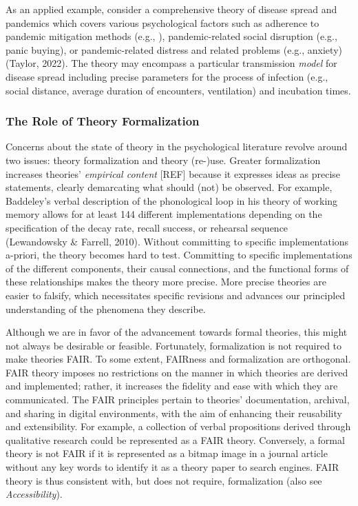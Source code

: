 \documentclass[
  man,floatsintext]{apa6}
\begin{document}
As an applied example, consider a comprehensive theory of disease spread and pandemics which covers various psychological factors such as adherence to pandemic mitigation methods (e.g., ), pandemic-related social disruption (e.g., panic buying), or pandemic-related distress and related problems (e.g., anxiety) (Taylor, 2022).
The theory may encompass a particular transmission \emph{model} for disease spread including precise parameters for the process of infection (e.g., social distance, average duration of encounters, ventilation) and incubation times.

\subsubsection{The Role of Theory Formalization}\label{the-role-of-theory-formalization}

Concerns about the state of theory in the psychological literature revolve around two issues: theory formalization and theory (re-)use.
Greater formalization increases theories' \emph{empirical content} {[}REF{]} because it expresses ideas as precise statements, clearly demarcating what should (not) be observed.
For example, Baddeley's verbal description of the phonological loop in his theory of working memory allows for at least 144 different implementations depending on the specification of the decay rate, recall success, or rehearsal sequence (Lewandowsky \& Farrell, 2010).
Without committing to specific implementations a-priori,
the theory becomes hard to test.
Committing to specific implementations of the different components, their causal connections, and the functional forms of these relationships makes the theory more precise.
More precise theories are easier to falsify,
which necessitates specific revisions and advances our principled understanding of the phenomena they describe.

Although we are in favor of the advancement towards formal theories,
this might not always be desirable or feasible.
Fortunately, formalization is not required to make theories FAIR.
To some extent, FAIRness and formalization are orthogonal.
FAIR theory imposes no restrictions on the manner in which theories are derived and implemented;
rather, it increases the fidelity and ease with which they are communicated.
The FAIR principles pertain to theories' documentation, archival, and sharing in digital environments, with the aim of enhancing their reusability and extensibility.
For example, a collection of verbal propositions derived through qualitative research could be represented as a FAIR theory.
Conversely, a formal theory is not FAIR if it is represented as a bitmap image in a journal article without any key words to identify it as a theory paper to search engines.
FAIR theory is thus consistent with, but does not require, formalization (also see \emph{Accessibility}).
\end{document}
